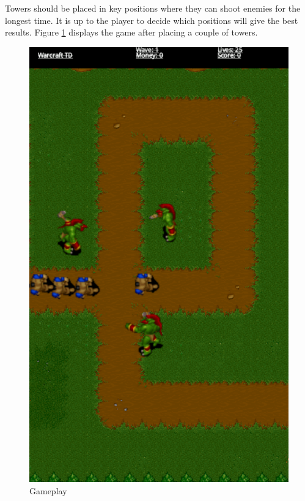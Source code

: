 Towers should be placed in key positions where they can shoot enemies for the longest time. It is up to the player to decide which positions will give the best results. Figure \ref{usermanual:gameplay} displays the game after placing a couple of towers.
\clearpage
\begin{figure} [h]
	\center
		\includegraphics[scale=0.5]{main/figures/screenshots/gameplay}
		\caption{Gameplay}
		\label{usermanual:gameplay}
\end{figure}




